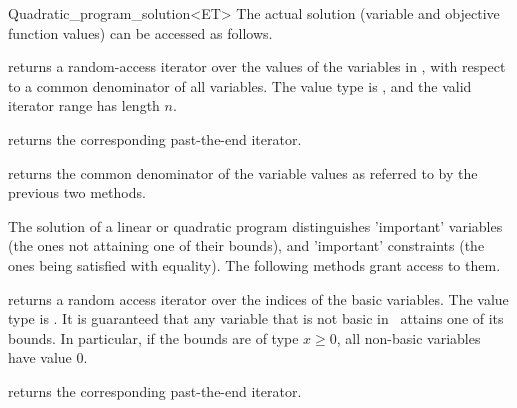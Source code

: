 \begin{ccRefClass}{Quadratic_program_solution<ET>}
The actual solution (variable and objective function values) can be
accessed as follows.






{returns a random-access iterator  over the values 
of the variables in \ccVar, with respect to a common
denominator of all variables. The value type is , and the valid
iterator range has length $n$.}

{returns the corresponding past-the-end iterator.}

{returns the common denominator of the variable values as referred to
by the previous two methods.}

The solution of a linear or quadratic program distinguishes 'important'
variables (the ones not attaining one of their bounds), and 'important'
constraints (the ones being satisfied with equality). The following
methods grant access to them.

{returns a random access iterator over the indices of the basic
variables. The value type is . It is guaranteed that any 
variable that is not basic in \ccVar\ attains one of its bounds. 
In particular, if the bounds are of type $x\geq 0$, all non-basic 
variables have value $0$.}

{returns the corresponding past-the-end iterator.}


\end{ccRefClass}
